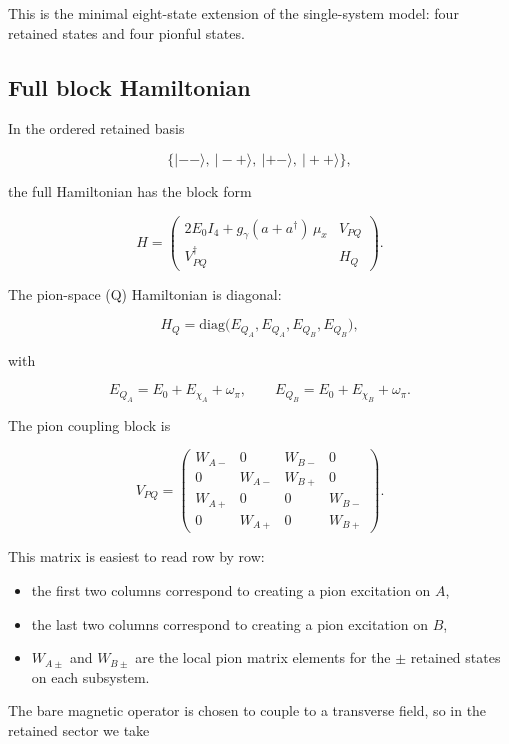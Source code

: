 \documentclass[
]{article}
\renewcommand{\[}{\begin{equation}}
\renewcommand{\]}{\end{equation}}
\providecommand{\tightlist}{%
  \setlength{\itemsep}{0pt}\setlength{\parskip}{0pt}}
\begin{document}
This is the minimal eight-state extension of the single-system model:
four retained states and four pionful states.

\subsection{Full block Hamiltonian}\label{full-block-hamiltonian}

In the ordered retained basis

\[
\{|--\rangle,\ |-+\rangle,\ |+-\rangle,\ |++\rangle\},
\label{eq:ABbasisOrder}
\]

the full Hamiltonian has the block form

\[
H=
\begin{pmatrix}
2E_0 I_4 + g_\gamma(a+a^\dagger)\,\mu_x & V_{PQ} \\
V_{PQ}^\dagger & H_Q
\end{pmatrix}.
\label{eq:ABfullH}
\]

The pion-space (Q) Hamiltonian is diagonal:

\[
H_Q=
\mathrm{diag}
\Big(
E_{Q_A},E_{Q_A},E_{Q_B},E_{Q_B}
\Big),
\label{eq:HQAB}
\]

with

\[
E_{Q_A}=E_0+E_{\chi_A}+\omega_\pi,
\qquad
E_{Q_B}=E_0+E_{\chi_B}+\omega_\pi.
\label{eq:EQAB}
\]

The pion coupling block is

\[
V_{PQ}=
\begin{pmatrix}
W_{A-} & 0 & W_{B-} & 0 \\
0 & W_{A-} & W_{B+} & 0 \\
W_{A+} & 0 & 0 & W_{B-} \\
0 & W_{A+} & 0 & W_{B+}
\end{pmatrix}.
\label{eq:VPQAB}
\]

This matrix is easiest to read row by row:

\begin{itemize}
\tightlist
\item
  the first two columns correspond to creating a pion excitation on
  \(A\),
\item
  the last two columns correspond to creating a pion excitation on
  \(B\),
\item
  \(W_{A\pm}\) and \(W_{B\pm}\) are the local pion matrix elements for
  the \(\pm\) retained states on each subsystem.
\end{itemize}

The bare magnetic operator is chosen to couple to a transverse field, so
in the retained sector we take
\end{document}
